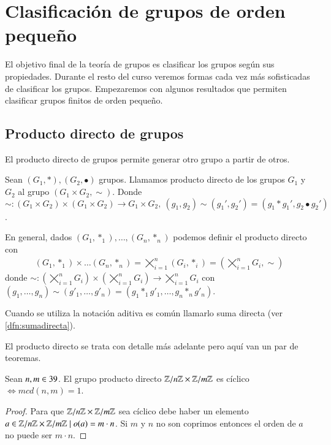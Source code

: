 
\chapter{Clasificación de grupos de orden pequeño}

El objetivo final de la teoría de grupos es clasificar los grupos según sus propiedades. Durante el resto del curso veremos formas cada vez más sofisticadas de clasificar los grupos. Empezaremos con algunos resultados que permiten clasificar grupos finitos de orden pequeño.

\section{Producto directo de grupos}

El producto directo de grupos permite generar otro grupo a partir de otros.

\begin{dfn}
	Sean $(G_1, \ast), (G_2, \bullet)$ grupos. Llamamos producto directo de los grupos $G_1$ y $G_2$ al grupo $(G_1\times G_2, \sim)$. Donde $\sim : (G_1 \times G_2) \times (G_1 \times G_2) \to G_1 \times G_2,\ (g_1, g_2) \sim (g_1', g_2') = (g_1\ast g_1', g_2 \bullet g_2')$.
	
	En general, dados $(G_1, \ast_1),\dots, (G_n, \ast_n)$ podemos definir el producto directo con
	\begin{align*}
		(G_1, \ast_1) \times \dots (G_n, \ast_n) = \varprod_{i=1}^n (G_i, \ast_i) = \left(\varprod_{i=1}^n G_i, \sim\right)
	\end{align*}
	donde $\sim: (\varprod_{i=1}^n G_i) \times (\varprod_{i=1}^n G_i) \to \varprod_{i=1}^n G_i$ con $(g_1, \dots, g_n) \sim (g'_1, \dots, g'_n) = (g_1 \ast_1 g'_1, \dots, g_n \ast_n g'_n)$.
\end{dfn}

Cuando se utiliza la notación aditiva es común llamarlo suma directa (ver \autoref{dfn:sumadirecta}).

El producto directo se trata con detalle más adelante pero aquí van un par de teoremas.

\begin{thm}
	Sean $n, m \in 39$. El grupo producto directo $\mathbb{Z}/n\mathbb{Z} \times \mathbb{Z}/m\mathbb{Z}$ es cíclico $\iff mcd(n,m) = 1$.
\end{thm}

\begin{proof}
	Para que $\mathbb{Z}/n\mathbb{Z} \times \mathbb{Z}/m\mathbb{Z}$ sea cíclico debe haber un elemento $a \in \mathbb{Z}/n\mathbb{Z} \times \mathbb{Z}/m\mathbb{Z} \mid o(a) = m\cdot n$. Si $m$ y $n$ no son coprimos entonces el orden de $a$ no puede ser $m\cdot n$. %
\end{proof}

